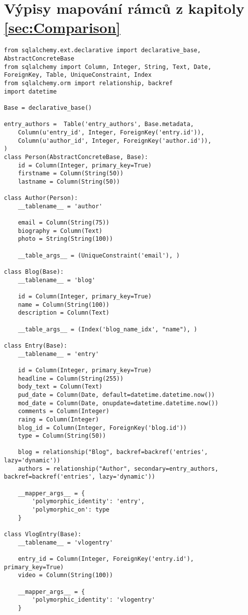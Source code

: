 \documentclass[ing,male,java,dept456]{diploma}						%
\begin{document}
\appendix
\section{Výpisy mapování rámců z kapitoly \ref{sec:Comparison}}
\begin{lstlisting}[style=custompython, label=src:sqla-mapping, caption={Schéma jednoduché aplikace pro vytváření blogů v SQLAlchemy}]
from sqlalchemy.ext.declarative import declarative_base, AbstractConcreteBase
from sqlalchemy import Column, Integer, String, Text, Date, ForeignKey, Table, UniqueConstraint, Index
from sqlalchemy.orm import relationship, backref
import datetime

Base = declarative_base()

entry_authors =  Table('entry_authors', Base.metadata,
    Column(u'entry_id', Integer, ForeignKey('entry.id')),
    Column(u'author_id', Integer, ForeignKey('author.id')),
)
class Person(AbstractConcreteBase, Base):
    id = Column(Integer, primary_key=True)
    firstname = Column(String(50))
    lastname = Column(String(50))

class Author(Person):
    __tablename__ = 'author'

    email = Column(String(75))
    biography = Column(Text)
    photo = String(String(100))

    __table_args__ = (UniqueConstraint('email'), )

class Blog(Base):
    __tablename__ = 'blog'

    id = Column(Integer, primary_key=True)
    name = Column(String(100))
    description = Column(Text)

    __table_args__ = (Index('blog_name_idx', "name"), )

class Entry(Base):
    __tablename__ = 'entry'

    id = Column(Integer, primary_key=True)
    headline = Column(String(255))
    body_text = Column(Text)
    pud_date = Column(Date, default=datetime.datetime.now())
    mod_date = Column(Date, onupdate=datetime.datetime.now())
    comments = Column(Integer)
    raing = Column(Integer)
    blog_id = Column(Integer, ForeignKey('blog.id'))
    type = Column(String(50))

    blog = relationship("Blog", backref=backref('entries', lazy='dynamic'))
    authors = relationship("Author", secondary=entry_authors, backref=backref('entries', lazy='dynamic'))

    __mapper_args__ = {
        'polymorphic_identity': 'entry',
        'polymorphic_on': type
    }

class VlogEntry(Base):
    __tablename__ = 'vlogentry'

    entry_id = Column(Integer, ForeignKey('entry.id'), primary_key=True)
    video = Column(String(100))

    __mapper_args__ = {
        'polymorphic_identity': 'vlogentry'
    }
\end{lstlisting}
\end{document}
